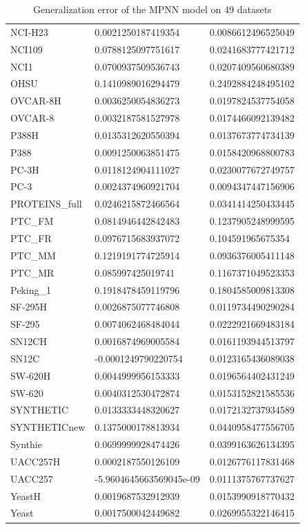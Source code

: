 \begin{table}[!ht]
\begin{tabular}{p{3.5cm}|p{5cm}p{5cm}}
    NCI-H23 & 0.0021250187419354 & 0.0086612496525049 \\ 
    NCI109 & 0.0788125097751617 & 0.0241683777421712 \\ 
    NCI1 & 0.0700937509536743 & 0.0207409560680389 \\ 
    OHSU & 0.1410989016294479 & 0.2492884248495102 \\ 
    OVCAR-8H & 0.0036250054836273 & 0.0197824537754058 \\ 
    OVCAR-8 & 0.0032187581527978 & 0.0174466092139482 \\ 
    P388H & 0.0135312620550394 & 0.0137673774734139 \\ 
    P388 & 0.0091250063851475 & 0.0158420968800783 \\ 
    PC-3H & 0.0118124904111027 & 0.0230077672749757 \\ 
    PC-3 & 0.0024374960921704 & 0.0094347447156906 \\ 
    PROTEINS\_full & 0.0246215872466564 & 0.0341414250433445 \\ 
    PTC\_FM & 0.0814946442842483 & 0.1237905248999595 \\ 
    PTC\_FR & 0.0976715683937072 & 0.104591965675354 \\ 
    PTC\_MM & 0.1219191774725914 & 0.0936376005411148 \\ 
    PTC\_MR & 0.085997425019741 & 0.1167371049523353 \\ 
    Peking\_1 & 0.1918478459119796 & 0.1804585009813308 \\ 
    SF-295H & 0.0026875077746808 & 0.0119734490290284 \\ 
    SF-295 & 0.0074062468484044 & 0.0222921669483184 \\ 
    SN12CH & 0.0016874969005584 & 0.0161193944513797 \\ 
    SN12C & -0.0001249790220754 & 0.0123165436089038 \\ 
    SW-620H & 0.0044999956153333 & 0.0196564402431249 \\ 
    SW-620 & 0.0040312530472874 & 0.0153152821585536 \\ 
    SYNTHETIC & 0.0133333448320627 & 0.0172132737934589 \\ 
    SYNTHETICnew & 0.1375000178813934 & 0.0440958477556705 \\ 
    Synthie & 0.0699999928474426 & 0.0399163626134395 \\ 
    UACC257H & 0.0002187550126109 & 0.0126776117831468 \\ 
    UACC257 & -5.9604645663569045e-09 & 0.0111375767737627 \\ 
    YeastH & 0.0019687532912939 & 0.0153990918770432 \\ 
    Yeast & 0.0017500042449682 & 0.0269955322146415 \\ 
    \bottomrule
    \end{tabular}
    \caption{Generalization error of the MPNN model on 49 datasets}
    \label{tab:ge_mpnn} %
\end{table}

